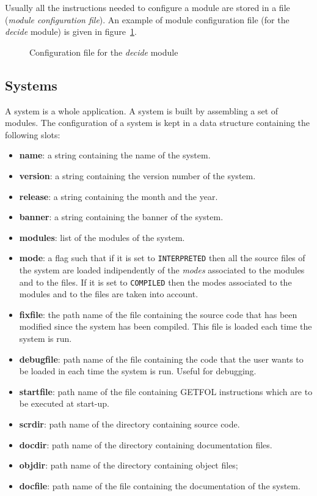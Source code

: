 Usually all the instructions needed to configure a module are stored in a
file ({\em module configuration file}).
An example of module configuration file (for the {\em decide} module)
is given in figure~\ref{modcfg}.

\begin{figure}
 
 \caption{
	Configuration file for the {\em decide} module
 }
 \label{modcfg}
\end{figure}


\subsection{Systems}

A system is a whole application.
A system is built by assembling a set of modules.
The configuration of a system is kept in a data structure containing the
following slots:

\begin{itemize}
	\item {\bf name}:
		a string containing the name of the system.
	\item {\bf version}:
		a string containing the version number of the system.
	\item {\bf release}:
		 a string containing the month and the year.
	\item {\bf banner}:
		a string containing the banner of the system.
	\item {\bf modules}:
		list of the modules of the system.
	\item {\bf mode}:
		a flag such that if it is set to {\tt INTERPRETED} then all
		the source files of the system are loaded indipendently of the {\em
		modes} associated to the modules and to the files.
		If it is set to {\tt COMPILED} then the modes associated to the modules
		and to the files are taken into account.
	\item {\bf fixfile}:
		the path name of the file containing the source code that has been
		modified since the system has been compiled.
		This file is loaded each time the system is run.
	\item {\bf debugfile}:
		path name of the file containing the code that the user wants to be
		loaded in each time the system is run. 
		Useful for debugging.
	\item {\bf startfile}:
		path name of the file containing GETFOL instructions which are to be
		executed at start-up.
	\item {\bf scrdir}:
		path name of the directory containing source code.
	\item {\bf docdir}:
		path name of the directory containing documentation files.
	\item {\bf objdir}:
		path name of the directory containing object files;
	\item {\bf docfile}:
		path name of the file containing the documentation of  the system.
\end{itemize}

